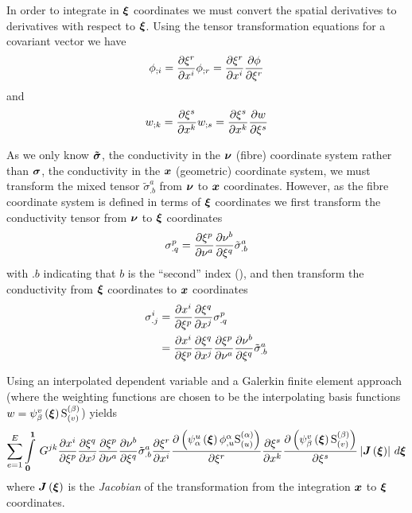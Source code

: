 In order to integrate in $\vect{\xi}$ coordinates we must convert the spatial
derivatives to derivatives with respect to $\vect{\xi}$. Using the tensor
transformation equations for a covariant vector we have
\begin{equation}  
   {\phi}_{;i} = \dfrac{\partial \xi^{r}}{\partial x^{i}}  {\phi}_{;r} = \dfrac{\partial \xi^{r}}{\partial x^{i}}  \dfrac{\partial \phi}{\partial \xi^{r}} 
\end{equation}
and 
\begin{equation}
   {w}_{;k} = \dfrac{\partial \xi^{s}}{\partial x^{k}}  {w}_{;s} = \dfrac{\partial \xi^{s}}{\partial x^{k}}  \dfrac{\partial w}{\partial \xi^{s}} 
\end{equation}

As we only know $\boldsymbol{\tilde{\sigma}}$, the conductivity in the
$\vect{\nu}$ (fibre) coordinate system rather than $\boldsymbol{\sigma}$, the
conductivity in the $\vect{x}$ (geometric) coordinate system, we must transform the mixed
tensor ${\tilde{\sigma}}^{a}_{.b}$ from $\vect{\nu}$ to $\vect{x}$ coordinates. However, as the
fibre coordinate system is defined in terms of $\vect{\xi}$ coordinates we
first transform the conductivity tensor from $\vect{\nu}$ to $\vect{\xi}$
coordinates \ie
\begin{equation}
  \sigma^{p}_{.q}= \dfrac{\partial \xi^{p}}{\partial \nu^{a}}  \dfrac{\partial \nu^{b}}{\partial \xi^{q}} {\tilde{\sigma}}^{a}_{.b}
\end{equation}
with $.b$ indicating that $b$ is the ``second'' index (),
and then transform the conductivity from $\vect{\xi}$ coordinates to
$\vect{x}$ coordinates \ie
\begin{equation}
  \begin{split}
    \sigma^{i}_{.j} &=  \dfrac{\partial x^{i}}{\partial \xi^{p}}  \dfrac{\partial \xi^{q}}{\partial x^{j}} {\sigma}^{p}_{.q} \\
    &=  \dfrac{\partial x^{i}}{\partial \xi^{p}}  \dfrac{\partial \xi^{q}}{\partial x^{j}}  \dfrac{\partial \xi^{p}}{\partial \nu^{a}}  \dfrac{\partial \nu^{b}}{\partial \xi^{q}} {\tilde{\sigma}}^{a}_{.b}
  \end{split}
\end{equation}

Using an interpolated dependent variable and a Galerkin finite element
approach (where the weighting functions are chosen to be the interpolating
basis functions \ie $w=\gbfn{\beta}{v}{\vect{\xi}}\gsf{(\beta)}{(v)}$) yields
\begin{equation}
  \dsum_{e=1}^{E}\gint{\vect{0}}{\vect{1}}{G^{jk}\delby{x^{i}}{\xi^{p}}
    \delby{\xi^{q}}{x^{j}}\delby{\xi^{p}} {\nu^{a}}
    \delby{\nu^{b}}{\xi^{q}}{\tilde{\sigma}}^{a}_{.b}\delby{\xi^{r}}{x^{i}}
    \delby{\pbrac{\gbfn{\alpha}{u}{\vect{\xi}}\nodedof{\phi}{\alpha}{u}\gsf{(\alpha)}{(u)}}}{\xi^{r}}
    \delby{\xi^{s}}{x^{k}}\delby{\pbrac{\gbfn{\beta}{v}{\vect{\xi}}\gsf{(\beta)}{(v)}}}{\xi^{s}}
    \abs{\fnof{\matr{J}}{\vect{\xi}}}}{\vect{\xi}}
\end{equation}
where $\fnof{\matr{J}}{\vect{\xi}}$ is the \emph{Jacobian} of the
transformation from the integration $\vect{x}$ to $\vect{\xi}$ coordinates.


